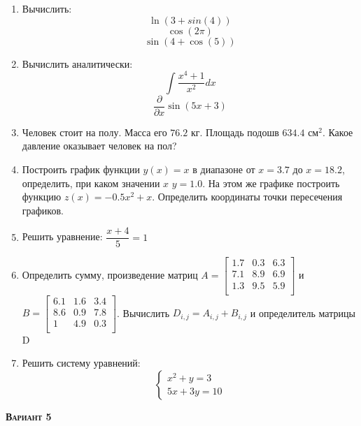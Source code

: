 \begin{enumerate}
\item Вычислить: 
\begin{equation*}\ln(3+sin(4))                     \end{equation*}
\begin{equation*}\cos(2 \pi)                       \end{equation*}
\begin{equation*}\sin(4+\cos(5))                   \end{equation*}

\item Вычислить аналитически: 
 \begin{equation*} \int \dfrac{x^4+1}{x^2} dx \end{equation*}\begin{equation*} {\dfrac{\partial} {\partial x}\sin(5 x +3)}         \end{equation*}


\item Человек стоит на полу. Масса его $76.2$ кг. Площадь подошв $634.4$ $\text{см}^2$. Какое давление оказывает человек на пол?

\item Построить график функции $y(x)=x                     $ в диапазоне от $x=3.7$ до $x=18.2$, определить, при каком значении $x$ $y=1.0$. На этом же графике построить функцию $z(x)=-0.5 x^2 + x              $. Определить координаты точки пересечения графиков. \item Решить уравнение: $\dfrac{x+4}{5}=1     $

\item Определить сумму, произведение матриц $A=\begin{bmatrix}
1.7 &0.3 &6.3 \\
7.1 &8.9 &6.9 \\
1.3 &9.5 &5.9 \\
\end{bmatrix}
$ и $B=\begin{bmatrix}
6.1 &1.6 &3.4 \\
8.6 &0.9 &7.8 \\
1 &4.9 &0.3 \\
\end{bmatrix}
$. Вычислить $D_{i,j}=A_{i,j}  +  B_{i,j}$ и определитель матрицы D

\item Решить систему уравнений: \begin{equation*} \begin{cases} x^2+y=3              \\ 5x +3y=10                 \end{cases} \end{equation*} 

\end{enumerate}
\textsc{\textbf{Вариант 5}}

